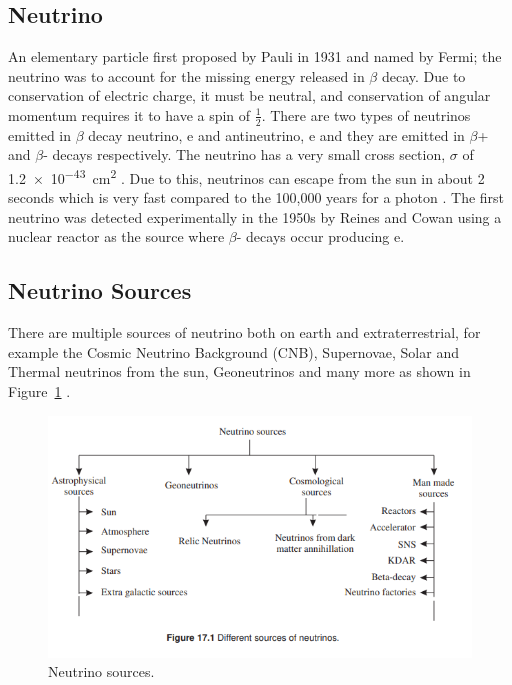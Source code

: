 \subsection{Neutrino}

An elementary particle first proposed by Pauli in 1931 and named by Fermi; the neutrino was to account for the missing energy released in $\beta$ decay. Due to conservation of electric charge, it must be neutral, and conservation of angular momentum requires it to have a spin of $\frac{1}{2}$. There are two types of neutrinos emitted in $\beta$ decay neutrino, e and antineutrino, e and they are emitted in $\beta$+ and $\beta$- decays respectively. The neutrino has a very small cross section, $\sigma$ of \SI{1.2e-43}{\centi\meter\squared} . Due to this, neutrinos can escape from the sun in about 2 seconds which is very fast compared to the 100,000 years for a photon . The first neutrino was detected experimentally in the 1950s by Reines and Cowan using a nuclear reactor as the source where $\beta$- decays occur producing e.

\subsection{Neutrino Sources}
There are multiple sources of neutrino both on earth and extraterrestrial, for example the Cosmic Neutrino Background (CNB), Supernovae, Solar and Thermal neutrinos from the sun, Geoneutrinos and many more as shown in Figure~\ref{fig:Nsource} . 
\begin{figure}[H]
	\centering
	\includegraphics[width=\textwidth,height=\textheight]{assets/NeutrinoSourcesSajjad.png}
	\caption{Neutrino sources.}
	\label{fig:Nsource}
\end{figure}

